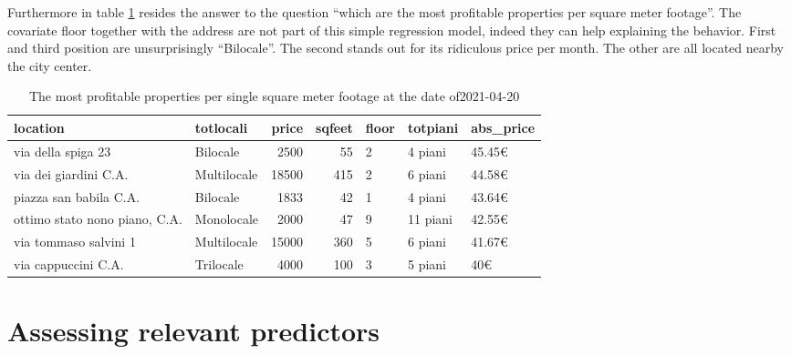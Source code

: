 \documentclass[
  12pt,
  a4paper,
  oneside]{book}
\theoremstyle{definition}
\theoremstyle{definition}
\theoremstyle{definition}
\theoremstyle{remark}
\begin{document}
Furthermore in table \ref{tab:TopAbsPrice} resides the answer to the question ``which are the most profitable properties per square meter footage''. The covariate floor together with the address are not part of this simple regression model, indeed they can help explaining the behavior. First and third position are unsurprisingly ``Bilocale''. The second stands out for its ridiculous price per month. The other are all located nearby the city center.

\begin{table}

\caption{\label{tab:TopAbsPrice}The most profitable properties per single square meter footage at the date of2021-04-20}
\centering
\begin{tabular}[t]{llrrlll}
\toprule
location & totlocali & price & sqfeet & floor & totpiani & abs\_price\\
\midrule
via della spiga 23 & Bilocale & 2500 & 55 & 2 & 4 piani & 45.45€\\
via dei giardini C.A. & Multilocale & 18500 & 415 & 2 & 6 piani & 44.58€\\
piazza san babila C.A. & Bilocale & 1833 & 42 & 1 & 4 piani & 43.64€\\
ottimo stato nono piano, C.A. & Monolocale & 2000 & 47 & 9 & 11 piani & 42.55€\\
via tommaso salvini 1 & Multilocale & 15000 & 360 & 5 & 6 piani & 41.67€\\
\addlinespace
via cappuccini C.A. & Trilocale & 4000 & 100 & 3 & 5 piani & 40€\\
\bottomrule
\end{tabular}
\end{table}

\hypertarget{assessing-relevant-predictors}{%
\section{Assessing relevant predictors}\label{assessing-relevant-predictors}}
\end{document}
